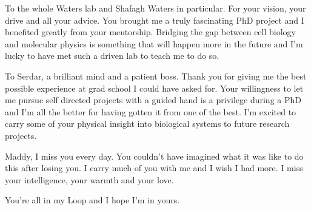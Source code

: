 To the whole Waters lab and Shafagh Waters in particular. For your vision, your drive and all your advice. You brought me a truly fascinating PhD project and I benefited greatly from your mentorship. Bridging the gap between cell biology and molecular physics is something that will happen more in the future and I'm lucky to have met such a driven lab to teach me to do so. 

To Serdar, a brilliant mind and a patient boss. Thank you for giving me the best possible experience at grad school I could have asked for. Your willingness to let me pursue self directed projects with a guided hand is a privilege during a PhD and I'm all the better for having gotten it from one of the best. I'm excited to carry some of your physical insight into biological systems to future research projects. 

Maddy, I miss you every day. You couldn't have imagined what it was like to do this after losing you. I carry much of you with me and I wish I had more. I miss your intelligence, your warmth and your love.

You're all in my Loop and I hope I'm in yours.

